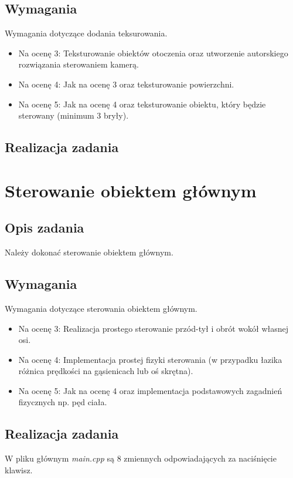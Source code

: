 \documentclass[a4paper, 12pt]{report}
\begin{document}
\section{Wymagania}

Wymagania dotyczące dodania teksurowania.
\begin{itemize}
\item Na ocenę 3: Teksturowanie obiektów otoczenia oraz utworzenie autorskiego rozwiązania sterowaniem kamerą.
\item Na ocenę 4: Jak na ocenę 3 oraz teksturowanie powierzchni.
\item Na ocenę 5: Jak na ocenę 4 oraz teksturowanie obiektu, który będzie sterowany (minimum 3 bryły).
\end{itemize}
\section{Realizacja zadania}



\chapter{Sterowanie obiektem głównym}
\section{Opis zadania}
Należy dokonać sterowanie obiektem głównym.
\section{Wymagania}
Wymagania dotyczące sterowania obiektem głównym.
\begin{itemize}
\item Na ocenę 3: Realizacja prostego sterowanie przód-tył i obrót wokół własnej osi.
\item Na ocenę 4: Implementacja prostej fizyki sterowania (w przypadku łazika różnica prędkości na gąsienicach lub oś skrętna).
\item Na ocenę 5: Jak na ocenę 4 oraz implementacja podstawowych zagadnień fizycznych np. pęd ciała.
\end{itemize}
\section{Realizacja zadania}

W pliku głównym \emph{main.cpp} są 8 zmiennych odpowiadających za naciśnięcie klawisz.
\end{document}
